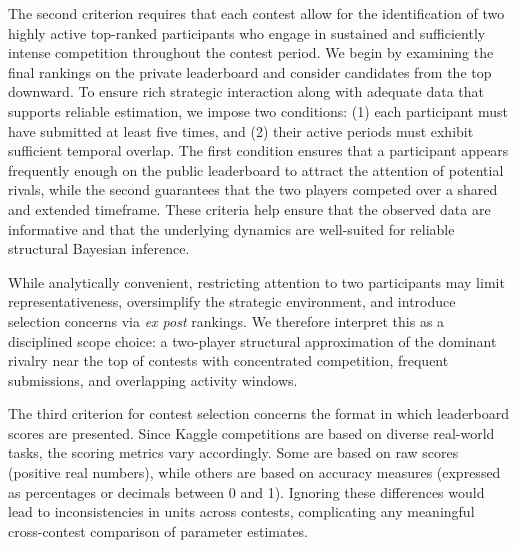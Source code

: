 \documentclass[mnsc]{informs3}
\begin{document}
The second criterion requires that each contest allow for the identification of two highly active top-ranked participants who engage in sustained and sufficiently intense competition throughout the contest period.
We begin by examining the final rankings on the private leaderboard and consider candidates from the top downward.
To ensure rich strategic interaction along with adequate data that supports reliable estimation, we impose two conditions: (1) each participant must have submitted at least five times, and (2) their active periods must exhibit sufficient temporal overlap.
The first condition ensures that a participant appears frequently enough on the public leaderboard to attract the attention of potential rivals, while the second guarantees that the two players competed over a shared and extended timeframe.
These criteria help ensure that the observed data are informative and that the underlying dynamics are well-suited for reliable structural Bayesian inference.

While analytically convenient, restricting attention to two participants may limit representativeness, oversimplify the strategic environment, and introduce selection concerns via \textit{ex post} rankings.
We therefore interpret this as a disciplined scope choice: a two-player structural approximation of the dominant rivalry near the top of contests with concentrated competition, frequent submissions, and overlapping activity windows.

The third criterion for contest selection concerns the format in which leaderboard scores are presented.
Since Kaggle competitions are based on diverse real-world tasks, the scoring metrics vary accordingly.
Some are based on raw scores (positive real numbers), while others are based on accuracy measures (expressed as percentages or decimals between 0 and 1).
Ignoring these differences would lead to inconsistencies in units across contests, complicating any meaningful cross-contest comparison of parameter estimates.
\end{document}
